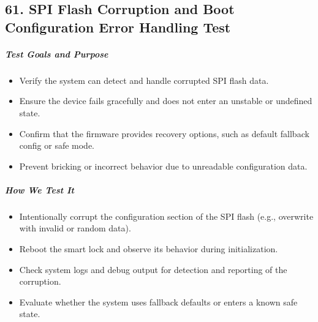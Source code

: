 


\newpage
\begin{samepage}

\subsection*{61. SPI Flash Corruption and Boot Configuration Error Handling Test}
\subparagraph{Test Goals and Purpose}
\begin{itemize}
    \item Verify the system can detect and handle corrupted SPI flash data.
    \item Ensure the device fails gracefully and does not enter an unstable or undefined state.
    \item Confirm that the firmware provides recovery options, such as default fallback config or safe mode.
    \item Prevent bricking or incorrect behavior due to unreadable configuration data.
\end{itemize}

\subparagraph{How We Test It}
\begin{itemize}
    \item Intentionally corrupt the configuration section of the SPI flash (e.g., overwrite with invalid or random data).
    \item Reboot the smart lock and observe its behavior during initialization.
    \item Check system logs and debug output for detection and reporting of the corruption.
    \item Evaluate whether the system uses fallback defaults or enters a known safe state.
\end{itemize}


\end{samepage}
